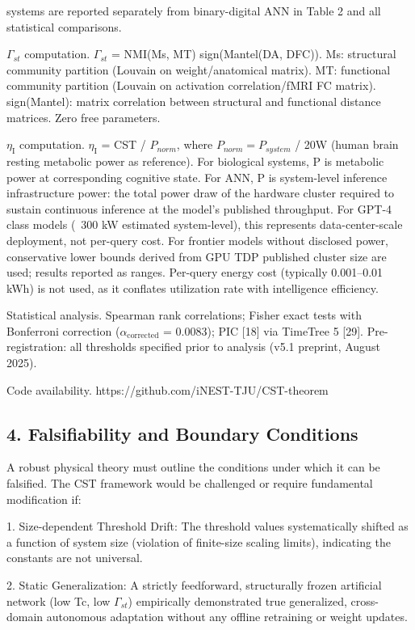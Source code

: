 \documentclass[a4paper,12pt]{article}
\begin{document}
\dagNMH systems are reported separately from binary-digital ANN in Table 2 and all statistical comparisons.

$\Gamma_{st}$ computation. $\Gamma_{st}$ = NMI(Ms, MT)  \cdot  sign(Mantel(DA, DFC)). Ms: structural community partition (Louvain on weight/anatomical matrix). MT: functional community partition (Louvain on activation correlation/fMRI FC matrix). sign(Mantel): matrix correlation between structural and functional distance matrices. Zero free parameters.

$\eta_{\text{I}}$ computation. $\eta_{\text{I}}$ = CST / $P_{norm}$, where $P_{norm} = P_{system}$ / 20W (human brain resting metabolic power as reference).
For biological systems, P is metabolic power at corresponding cognitive state.
For ANN, P is system-level inference infrastructure power: the total power draw of the hardware cluster required to sustain continuous inference at the model's published throughput.
For GPT-4 class models (~300 kW estimated system-level), this represents data-center-scale deployment, not per-query cost.
For frontier models without disclosed power, conservative lower bounds derived from GPU TDP  \times  published cluster size are used; results reported as ranges.
Per-query energy cost (typically 0.001--0.01 kWh) is not used, as it conflates utilization rate with intelligence efficiency.

Statistical analysis. Spearman rank correlations; Fisher exact tests with Bonferroni correction ($\alpha_{\text{corrected}}$ = 0.0083); PIC [18] via TimeTree 5 [29]. Pre-registration: all thresholds specified prior to analysis (v5.1 preprint, August 2025).

Code availability. https://github.com/iNEST-TJU/CST-theorem

\subsection{4. Falsifiability and Boundary Conditions}

A robust physical theory must outline the conditions under which it can be falsified. The CST framework would be challenged or require fundamental modification if:

1. Size-dependent Threshold Drift: The threshold values systematically shifted as a function of system size (violation of finite-size scaling limits), indicating the constants are not universal.

2. Static Generalization: A strictly feedforward, structurally frozen artificial network (low Tc, low $\Gamma_{st}$) empirically demonstrated true generalized, cross-domain autonomous adaptation without any offline retraining or weight updates.
\end{document}
